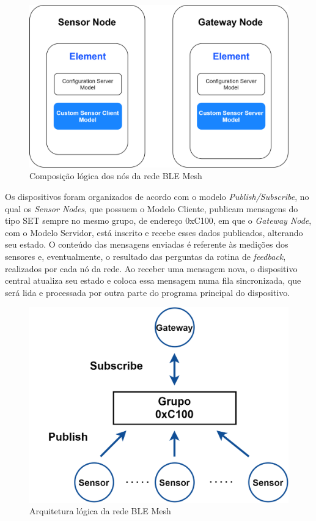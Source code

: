 \documentclass[../monografia.tex]{subfiles}
\begin{document}
\begin{figure}[h!]
	\centering
	\includegraphics[scale=0.22]{mesh-node-architecture.png}
	\caption{Composição lógica dos nós da rede BLE Mesh}
	\label{fig:mesh-node-architecture}
\end{figure}

Os dispositivos foram organizados de acordo com o modelo \textit{Publish/Subscribe}, no qual os \textit{Sensor Nodes}, que possuem o Modelo Cliente, publicam mensagens do tipo SET sempre no mesmo grupo, de endereço 0xC100, em que o \textit{Gateway Node}, com o Modelo Servidor, está inscrito e recebe esses dados publicados, alterando seu estado. O conteúdo das mensagens enviadas é referente às medições dos sensores e, eventualmente, o resultado das perguntas da rotina de \textit{feedback}, realizados por cada nó da rede. Ao receber uma mensagem nova, o dispositivo central atualiza seu estado e coloca essa mensagem numa fila sincronizada, que será lida e processada por outra parte do programa principal do dispositivo. 

\begin{figure}[h!]
	\centering
	\includegraphics[scale=0.22]{ble-mesh-architecture.png}
	\caption{Arquitetura lógica da rede BLE Mesh}
	\label{fig:mesh-network-architecture}
\end{figure}
\end{document}
